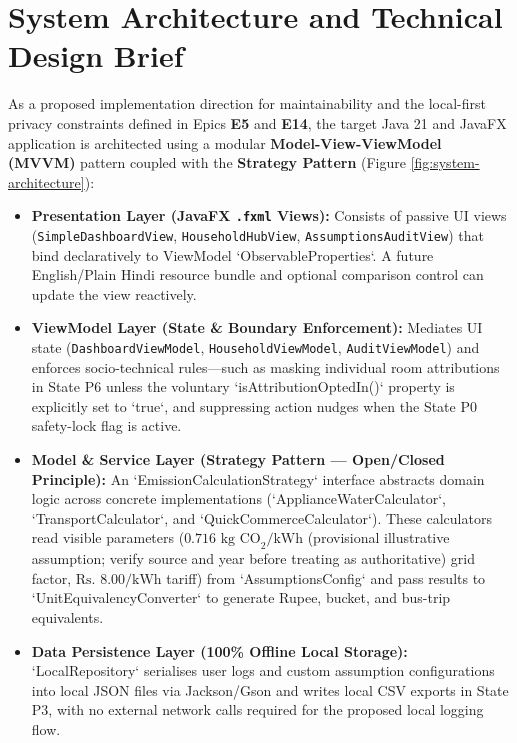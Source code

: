 \documentclass[12pt, a4paper]{article}
\begin{document}
\section{System Architecture and Technical Design Brief}
As a proposed implementation direction for maintainability and the local-first privacy constraints defined in Epics \textbf{E5} and \textbf{E14}, the target Java 21 and JavaFX application is architected using a modular \textbf{Model-View-ViewModel (MVVM)} pattern coupled with the \textbf{Strategy Pattern} (Figure \ref{fig:system-architecture}):

\begin{itemize}
    \item \textbf{Presentation Layer (JavaFX \texttt{.fxml} Views):} Consists of passive UI views (\texttt{SimpleDashboardView}, \texttt{HouseholdHubView}, \texttt{AssumptionsAuditView}) that bind declaratively to ViewModel `ObservableProperties`. A future English/Plain Hindi resource bundle and optional comparison control can update the view reactively.
    \item \textbf{ViewModel Layer (State \& Boundary Enforcement):} Mediates UI state (\texttt{DashboardViewModel}, \texttt{HouseholdViewModel}, \texttt{AuditViewModel}) and enforces socio-technical rules—such as masking individual room attributions in State P6 unless the voluntary `isAttributionOptedIn()` property is explicitly set to `true`, and suppressing action nudges when the State P0 safety-lock flag is active.
    \item \textbf{Model \& Service Layer (Strategy Pattern --- Open/Closed Principle):} An `EmissionCalculationStrategy` interface abstracts domain logic across concrete implementations (`ApplianceWaterCalculator`, `TransportCalculator`, and `QuickCommerceCalculator`). These calculators read visible parameters ($0.716\text{ kg CO}_2\text{/kWh}$ (provisional illustrative assumption; verify source and year before treating as authoritative) grid factor, $\text{Rs. }8.00\text{/kWh}$ tariff) from `AssumptionsConfig` and pass results to `UnitEquivalencyConverter` to generate Rupee, bucket, and bus-trip equivalents.
    \item \textbf{Data Persistence Layer (100\% Offline Local Storage):} `LocalRepository` serialises user logs and custom assumption configurations into local JSON files via Jackson/Gson and writes local CSV exports in State P3, with no external network calls required for the proposed local logging flow.
\end{itemize}
\end{document}
